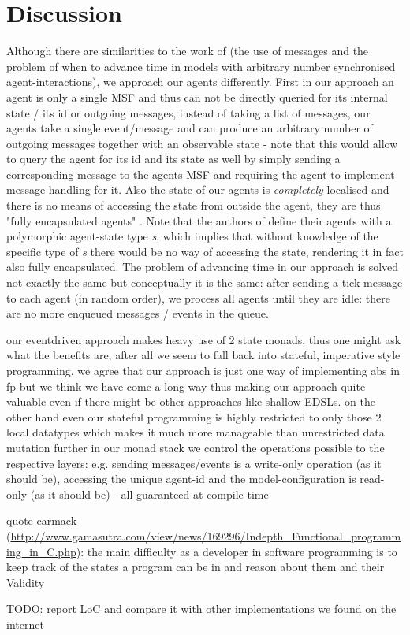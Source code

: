 \section{Discussion}
Although there are similarities to the work of \cite{botta_time_2010} (the use of messages and the problem of when to advance time in models with arbitrary number synchronised agent-interactions), we approach our agents differently. First in our approach an agent is only a single MSF and thus can not be directly queried for its internal state / its id or outgoing messages, instead of taking a list of messages, our agents take a single event/message and can produce an arbitrary number of outgoing messages together with an observable state - note that this would allow to query the agent for its id and its state as well by simply sending a corresponding message to the agents MSF and requiring the agent to implement message handling for it. Also the state of our agents is \textit{completely} localised and there is no means of accessing the state from outside the agent, they are thus "fully encapsulated agents" \cite{botta_time_2010}. Note that the authors of \cite{botta_time_2010} define their agents with a polymorphic agent-state type \textit{s}, which implies that without knowledge of the specific type of \textit{s} there would be no way of accessing the state, rendering it in fact also fully encapsulated. The problem of advancing time in our approach is solved not exactly the same but conceptually it is the same: after sending a tick message to each agent (in random order), we process all agents until they are idle: there are no more enqueued messages / events in the queue.

our eventdriven approach makes heavy use of 2 state monads, thus one might ask what the benefits are, after all we seem to fall back into stateful, imperative style programming. we agree that our approach is just one way of implementing abs in fp but we think we have come a long way thus making our approach quite valuable even if there might be other approaches like shallow EDSLs. on the other hand even our stateful programming is highly restricted to only those 2 local datatypes which makes it much more manageable than unrestricted data mutation
further in our monad stack we control the operations possible to the respective layers: e.g. sending messages/events is a write-only operation (as it should be), accessing the unique agent-id and the model-configuration is read-only (as it should be) - all guaranteed at compile-time

quote carmack (\url{http://www.gamasutra.com/view/news/169296/Indepth_Functional_programming_in_C.php}): the main difficulty as a developer in software programming is to keep track of the states a program can be in and reason about them and their Validity

TODO: report LoC and compare it with other implementations we found on the internet